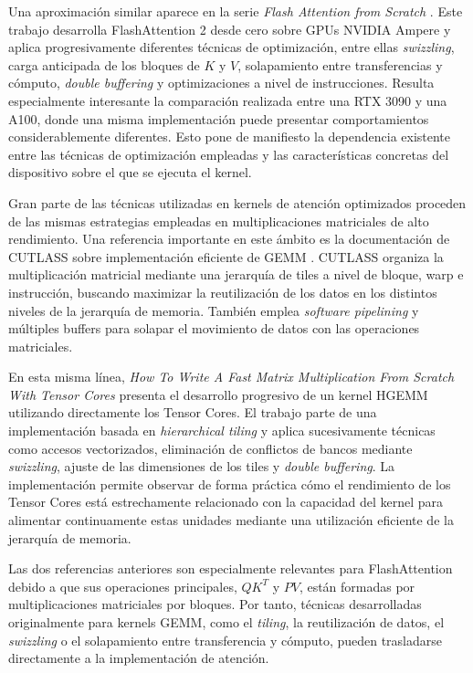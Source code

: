 Una aproximación similar aparece en la serie \textit{Flash Attention from Scratch} \cite{lubitschFlash}. Este trabajo desarrolla FlashAttention 2 desde cero sobre GPUs NVIDIA Ampere y aplica progresivamente diferentes técnicas de optimización, entre ellas \textit{swizzling}, carga anticipada de los bloques de \(K\) y \(V\), solapamiento entre transferencias y cómputo, \textit{double buffering} y optimizaciones a nivel de instrucciones. Resulta especialmente interesante la comparación realizada entre una RTX 3090 y una A100, donde una misma implementación puede presentar comportamientos considerablemente diferentes. Esto pone de manifiesto la dependencia existente entre las técnicas de optimización empleadas y las características concretas del dispositivo sobre el que se ejecuta el kernel.

Gran parte de las técnicas utilizadas en kernels de atención optimizados proceden de las mismas estrategias empleadas en multiplicaciones matriciales de alto rendimiento. Una referencia importante en este ámbito es la documentación de CUTLASS sobre implementación eficiente de GEMM \cite{cutlassEfficientGemm}. CUTLASS organiza la multiplicación matricial mediante una jerarquía de tiles a nivel de bloque, warp e instrucción, buscando maximizar la reutilización de los datos en los distintos niveles de la jerarquía de memoria. También emplea \textit{software pipelining} y múltiples buffers para solapar el movimiento de datos con las operaciones matriciales.

En esta misma línea, \textit{How To Write A Fast Matrix Multiplication From Scratch With Tensor Cores} \cite{armbrusterTensorCores} presenta el desarrollo progresivo de un kernel HGEMM utilizando directamente los Tensor Cores. El trabajo parte de una implementación basada en \textit{hierarchical tiling} y aplica sucesivamente técnicas como accesos vectorizados, eliminación de conflictos de bancos mediante \textit{swizzling}, ajuste de las dimensiones de los tiles y \textit{double buffering}. La implementación permite observar de forma práctica cómo el rendimiento de los Tensor Cores está estrechamente relacionado con la capacidad del kernel para alimentar continuamente estas unidades mediante una utilización eficiente de la jerarquía de memoria.

Las dos referencias anteriores son especialmente relevantes para FlashAttention debido a que sus operaciones principales, \(QK^T\) y \(PV\), están formadas por multiplicaciones matriciales por bloques. Por tanto, técnicas desarrolladas originalmente para kernels GEMM, como el \textit{tiling}, la reutilización de datos, el \textit{swizzling} o el solapamiento entre transferencia y cómputo, pueden trasladarse directamente a la implementación de atención.


